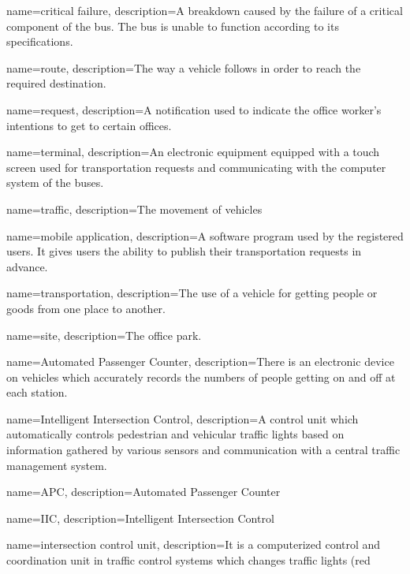 {%
	name={critical failure},
	description={A breakdown caused by the failure of a critical component
	of the bus. The bus is unable to function according to its
	specifications.}
}

{%
	name={route},
	description={The way a vehicle follows in order to reach the required
	destination.}
}

{%
	name={request},
	description={A notification used to indicate the office worker's
	intentions to get to certain offices.}
}

{%
	name={terminal},
	description={An electronic equipment equipped with a touch screen used
	for transportation requests and communicating with the computer system
	of the buses.}
}

{%
	name={traffic},
	description={The movement of vehicles}
}

{%
	name={mobile application},
	description={A software program used by the registered users. It gives
	users the ability to publish their transportation requests in advance.}
}

{%
	name={transportation},
	description={The use of a vehicle for getting people or goods from one
	place to another.}
}

{%
	name={site},
	description={The office park.}
}

{%
	name={Automated Passenger Counter},
	description={There is an electronic device on vehicles which accurately
	records the numbers of people getting on and off at each station.}
}

{%
	name={Intelligent Intersection Control},
	description={A control unit which automatically controls pedestrian and
	vehicular traffic lights based on information gathered by various
	sensors and communication with a central traffic management system.}
}

{%
	name={APC},
	description={Automated Passenger Counter}
}

{%
	name={IIC},
	description={Intelligent Intersection Control}
}

{%
	name={intersection control unit},
	description={It is a computerized control and coordination unit in
	traffic control systems which changes traffic lights (red}
}

